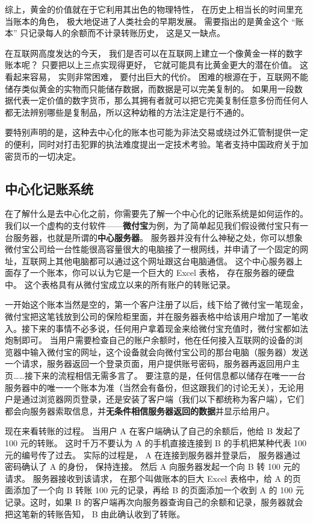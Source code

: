 综上，黄金的价值就在于它利用其出色的物理特性， 在历史上相当长的时间里充当账本的角色， 极大地促进了人类社会的早期发展。 需要指出的是黄金这个 “账本” 只记录每人的余额而不计录转账历史， 这是又一缺点。

在互联网高度发达的今天， 我们是否可以在互联网上建立一个像黄金一样的数字账本呢？ 只要把以上三点实现得更好， 它就可能具有比黄金更大的潜在价值。 这看起来容易， 实则非常困难， 要付出巨大的代价。 困难的根源在于，互联网不能储存类似黄金的实物而只能储存数据，而数据是可以完美复制的。 如果用一段数据代表一定价值的数字货币，那么其拥有者就可以把它完美复制任意多份而任何人都无法辨别哪些是复制品，所以这种幼稚的方法注定是行不通的。

要特别声明的是，这种去中心化的账本也可能为非法交易或绕过外汇管制提供一定的便利，同时对打击犯罪的执法难度提出一定技术考验。笔者支持中国政府关于加密货币的一切决定。

\subsection{中心化记账系统}
在了解什么是去中心化之前，你需要先了解一个中心化的记账系统是如何运作的。我们以一个虚构的支付软件——\textbf{微付宝}为例，为了简单起见我们假设微付宝只有一台服务器，也就是所谓的\textbf{中心服务器}。 服务器并没有什么神秘之处，你可以想象微付宝公司给一台性能很高容量很大的电脑接了一根网线，并申请了一个固定的网址，互联网上其他电脑都可以通过这个网址跟这台电脑通信。 这个中心服务器上面存了一个账本，你可以认为它是一个巨大的 Excel 表格， 存在服务器的硬盘中。 这个表格具有从微付宝成立以来的所有账户的转账记录。

一开始这个账本当然是空的，第一个客户注册了以后，线下给了微付宝一笔现金，微付宝把这笔钱放到公司的保险柜里面，并在服务器表格中给该用户增加了一笔收入。接下来的事情不必多说，任何用户拿着现金来给微付宝充值时，微付宝都如法炮制即可。 当用户需要检查自己的账户余额时，他在任何接入互联网的设备的浏览器中输入微付宝的网址，这个设备就会向微付宝公司的那台电脑（服务器）发送一个请求，服务器返回一个登录页面，用户提供账号密码，服务器再返回用户主页……接下来的流程相信无需多言了。 要注意的是，任何信息都以储存在唯一一台服务器中的唯一一个账本为准（当然会有备份，但这跟我们的讨论无关），无论用户是通过浏览器网页登录，还是安装了客户端（我们以下都统称为客户端），它们都会向服务器索取信息，并\textbf{无条件相信服务器返回的数据}并显示给用户。

现在来看转账的过程。 当用户 A 在客户端确认了自己的余额后，他给 B 发起了 100 元的转账。 这时千万不要认为 A 的手机直接连接到 B 的手机把某种代表 100 元的编号传了过去。 实际的过程是， A 在连接到服务器并登录后， 服务器通过密码确认了 A 的身份， 保持连接。 然后 A 向服务器发起一个向 B 转 100 元的请求。 服务器接收到该请求， 在那个叫做账本的巨大 Excel 表格中，给 A 的页面添加了一个向 B 转账 100 元的记录，再给 B 的页面添加一个收到 A 的 100 元记录。这时，如果 B 的客户端再次向服务器查询自己的余额和记录，服务器就会把这笔新的转账告知， B 由此确认收到了转账。

